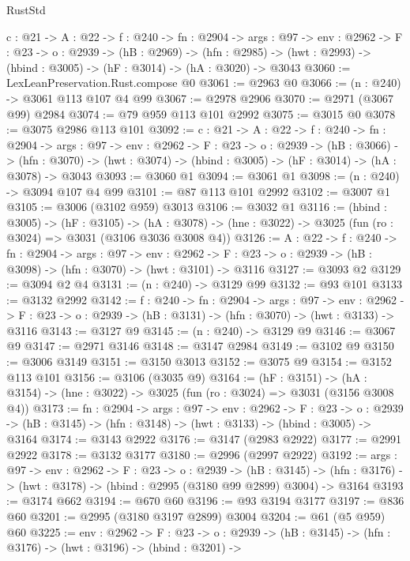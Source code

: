 \begin{lexlean}{RustStd}
\begin{coremodule}
{\begin{coremodule}
{{{{{{  {c : @21} ->
  {A : @22} ->
  {f : @240} ->
  {fn : @2904} ->
  {args : @97} ->
  {env : @2962} ->
  {F : @23} ->
  {o : @2939} ->
  (hB : @2969) ->
  (hfn : @2985) -> (hwt : @2993) -> (hbind : @3005) -> (hF : @3014) -> (hA : @3020) -> @3043
@3060 := LexLeanPreservation.Rust.compose @0
@3061 := @2963 @0
@3066 := (n : @240) -> @3061 @113 @107 @4 @99
@3067 := @2978 @2906
@3070 := @2971 (@3067 @99) @2984
@3074 := @79 @959 @113 @101 @2992
@3075 := @3015 @0
@3078 := @3075 @2986 @113 @101
@3092 := {c : @21} ->
  {A : @22} ->
  {f : @240} ->
  {fn : @2904} ->
  {args : @97} ->
  {env : @2962} ->
  {F : @23} ->
  {o : @2939} ->
  (hB : @3066) ->
  (hfn : @3070) -> (hwt : @3074) -> (hbind : @3005) -> (hF : @3014) -> (hA : @3078) -> @3043
@3093 := @3060 @1
@3094 := @3061 @1
@3098 := (n : @240) -> @3094 @107 @4 @99
@3101 := @87 @113 @101 @2992
@3102 := @3007 @1
@3105 := @3006 (@3102 @959) @3013
@3106 := @3032 @1
@3116 := (hbind : @3005) ->
  (hF : @3105) ->
  (hA : @3078) -> (hne : @3022) -> @3025 (fun (ro : @3024) => @3031 (@3106 @3036 @3008 @4))
@3126 := {A : @22} ->
  {f : @240} ->
  {fn : @2904} ->
  {args : @97} ->
  {env : @2962} ->
  {F : @23} -> {o : @2939} -> (hB : @3098) -> (hfn : @3070) -> (hwt : @3101) -> @3116
@3127 := @3093 @2
@3129 := @3094 @2 @4
@3131 := (n : @240) -> @3129 @99
@3132 := @93 @101
@3133 := @3132 @2992
@3142 := {f : @240} ->
  {fn : @2904} ->
  {args : @97} ->
  {env : @2962} ->
  {F : @23} -> {o : @2939} -> (hB : @3131) -> (hfn : @3070) -> (hwt : @3133) -> @3116
@3143 := @3127 @9
@3145 := (n : @240) -> @3129 @9
@3146 := @3067 @9
@3147 := @2971 @3146
@3148 := @3147 @2984
@3149 := @3102 @9
@3150 := @3006 @3149
@3151 := @3150 @3013
@3152 := @3075 @9
@3154 := @3152 @113 @101
@3156 := @3106 (@3035 @9)
@3164 := (hF : @3151) ->
  (hA : @3154) -> (hne : @3022) -> @3025 (fun (ro : @3024) => @3031 (@3156 @3008 @4))
@3173 := {fn : @2904} ->
  {args : @97} ->
  {env : @2962} ->
  {F : @23} ->
  {o : @2939} -> (hB : @3145) -> (hfn : @3148) -> (hwt : @3133) -> (hbind : @3005) -> @3164
@3174 := @3143 @2922
@3176 := @3147 (@2983 @2922)
@3177 := @2991 @2922
@3178 := @3132 @3177
@3180 := @2996 (@2997 @2922)
@3192 := {args : @97} ->
  {env : @2962} ->
  {F : @23} ->
  {o : @2939} ->
  (hB : @3145) -> (hfn : @3176) -> (hwt : @3178) -> (hbind : @2995 (@3180 @99 @2899) @3004) -> @3164
@3193 := @3174 @662
@3194 := @670 @60
@3196 := @93 @3194 @3177
@3197 := @836 @60
@3201 := @2995 (@3180 @3197 @2899) @3004
@3204 := @61 (@5 @959) @60
@3225 := {env : @2962} ->
  {F : @23} ->
  {o : @2939} ->
  (hB : @3145) ->
  (hfn : @3176) ->
  (hwt : @3196) ->
  (hbind : @3201) ->
}}}}}}
\end{coremodule}}
\end{coremodule}
\end{lexlean}
